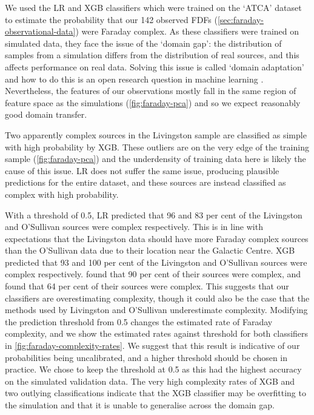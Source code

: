     We used the LR and XGB classifiers which were trained on the `ATCA' dataset to estimate the probability that our 142 observed FDFs (\autoref{sec:faraday-observational-data}) were Faraday complex. As these classifiers were trained on simulated data, they face the issue of the `domain gap': the distribution of samples from a simulation differs from the distribution of real sources, and this affects performance on real data. Solving this issue is called `domain adaptation' and how to do this is an open research question in machine learning \citep{zhang2019transfer,pan10transfer}. Nevertheless, the features of our observations mostly fall in the same region of feature space as the simulations (\autoref{fig:faraday-pca}) and so we expect reasonably good domain transfer.

    Two apparently complex sources in the Livingston sample are classified as simple with high probability by XGB. These outliers are on the very edge of the training sample (\autoref{fig:faraday-pca}) and the underdensity of training data here is likely the cause of this issue. LR does not suffer the same issue, producing plausible predictions for the entire dataset, and these sources are instead classified as complex with high probability.

    With a threshold of 0.5, LR predicted that 96 and 83 per cent of the Livingston and O'Sullivan sources were complex respectively. This is in line with expectations that the Livingston data should have more Faraday complex sources than the O'Sullivan data due to their location near the Galactic Centre. XGB predicted that 93 and 100 per cent of the Livingston and O'Sullivan sources were complex respectively. \citet{livingston21faraday} found that 90 per cent of their sources were complex, and \citet{osullivan_broad-band_2017} found that 64 per cent of their sources were complex. This suggests that our classifiers are overestimating complexity, though it could also be the case that the methods used by Livingston and O'Sullivan underestimate complexity. Modifying the prediction threshold from 0.5 changes the estimated rate of Faraday complexity, and we show the estimated rates against threshold for both classifiers in \autoref{fig:faraday-complexity-rates}. We suggest that this result is indicative of our probabilities being uncalibrated, and a higher threshold should be chosen in practice. We chose to keep the threshold at 0.5 as this had the highest accuracy on the simulated validation data. The very high complexity rates of XGB and two outlying classifications indicate that the XGB classifier may be overfitting to the simulation and that it is unable to generalise across the domain gap.

